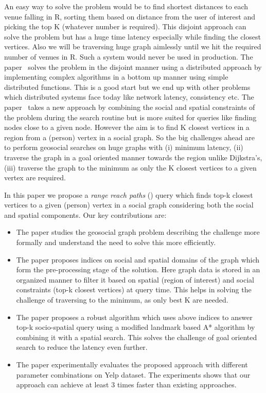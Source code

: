 An easy way to solve the problem would be to find shortest distances to each venue falling in R, sorting them based on distance from the user of interest and picking the top K (whatever number is required). This disjoint approach can solve the problem but has a huge time latency especially while finding the closest vertices. Also we will be traversing huge graph aimlessly until we hit the required number of venues in R. Such a system would never be used in production. The paper~\cite{NSD2013} solves the problem in the disjoint manner using a distributed approach by implementing complex algorithms in a bottom up manner using simple distributed functions. This is a good start but we end up with other problems which distributed systems face today like network latency, consistency etc. The paper~\cite{KJY+2015} takes a new approach by combining the social and spatial constraints of the problem during the search routine but is more suited for queries like finding nodes close to a given node. However the aim is to find K closest vertices in a region from a (person) vertex in a social graph. So the big challenges ahead are to perform geosocial searches on huge graphs with (i) minimum latency, (ii) traverse the graph in a goal oriented manner towards the region unlike Dijkstra's, (iii) traverse the graph to the minimum as only the K closest vertices to a given vertex are required.

In this paper we propose a \textit{range reach paths} ({\rrp}) query which finds top-k closest vertices to a given (person) vertex in a social graph considering both the social and spatial components. Our key contributions are:
\begin{itemize}
	\item The paper studies the geosocial graph problem describing the challenge more formally and understand the need to solve this more efficiently.
	\item The paper proposes indices on social and spatial domains of the graph which form the pre-processing stage of the solution. Here graph data is stored in an organized manner to filter it based on spatial (region of interest) and social constraints (top-k closest vertices) at query time. This helps in solving the challenge of traversing to the minimum, as only best K are needed.
	\item The paper proposes a robust algorithm which uses above indices to answer top-k socio-spatial query using a modified landmark based A* algorithm by combining it with a spatial search. This solves the challenge of goal oriented search to reduce the latency even further.
	\item The paper experimentally evaluates the proposed approach with different parameter combinations on Yelp dataset. The experiments shows that our approach can achieve at least 3 times faster than existing approaches.
\end{itemize}

